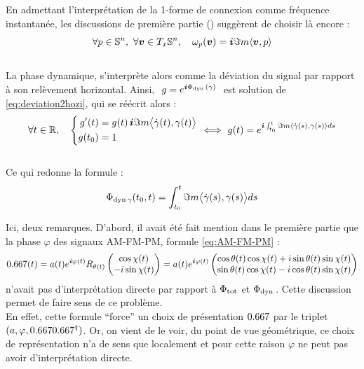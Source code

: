 En admettant l'interprétation de la 1-forme de connexion comme fréquence instantanée, les discussions de première partie () suggèrent de choisir là encore :
\begin{equation} \label{eq:conn2SUPC}
	\forall p\in\S{n},\ \forall \bf{v}\in\tg[x]{\S{n}},\quad \conn_p(\bf{v}) = \i\Im m \langle \bf{v}, p\rangle
\end{equation}
\\
La phase dynamique, s'interprète alors comme la déviation du signal par rapport à son relèvement horizontal. Ainsi, $\ g = e^{\i \phased(\gamma)}\ $ est solution de \eqref{eq:deviation2hozi}, qui se réécrit alors :
\[\forall t\in\R,\quad \left\{ \begin{aligned}
	g'(t)  &= g(t)\, \i\Im m \big\langle \dot{\gamma}(t) , \gamma(t) \big\rangle \\
	g(t_0) &= 1
\end{aligned}\ \right. \Llr\ g(t) = e^{\i  \int_{t_0}^t \Im m\langle \dot{\gamma}(s) , \gamma(s) \rangle ds}\]
\\
Ce qui redonne la formule :
\begin{equation}\label{eq:phased_vgeodiff}
	\phased[\gamma](t_0, t) = \int_{t_0}^t \Im m\big\langle \dot{\gamma}(s) , \gamma(s) \big\rangle ds
\end{equation}
\skipl

Ici, deux remarques. D'abord, il avait été fait mention dans le première partie que la phase $\varphi$ des signaux AM-FM-PM, formule \eqref{eq:AM-FM-PM} :
\[\x(t) = a(t)e^{\i \varphi(t)} R_{\theta(t)} \begin{pmatrix} \cos\chi(t) \\ -i\sin\chi(t) \end{pmatrix} 
= a(t)e^{\i \varphi(t)} \begin{pmatrix} \cos\theta(t) \cos\chi(t) + i\sin\theta(t) \sin\chi(t) \\ \sin\theta(t) \cos\chi(t) - i\cos\theta(t) \sin\chi(t) \end{pmatrix}\]
n'avait pas d'interprétation directe par rapport à $\phaset$ et $\phased$.
Cette discussion permet de faire sens de ce problème.
\\
En effet, cette formule ``force'' un choix de présentation $\x$ par le triplet $(a, \varphi, \x\x^\dagger)$.
Or, on vient de le voir, du point de vue géométrique, ce choix de représentation n'a de sens que localement et pour cette raison $\varphi$ ne peut pas avoir d'interprétation directe.
\\

